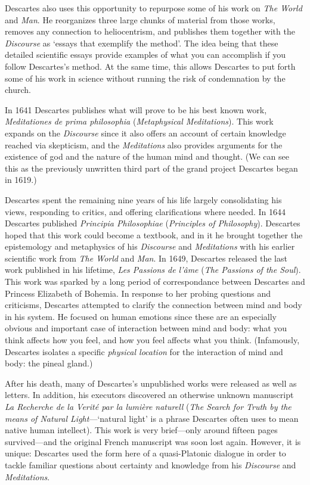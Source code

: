 Descartes also uses this opportunity to repurpose some of his work on \textit{The World} and \textit{Man}. He reorganizes three large chunks of material from those works, removes any connection to heliocentrism, and publishes them together with the \textit{Discourse} as `essays that exemplify the method'. The idea being that these detailed scientific essays provide examples of what you can accomplish if you follow Descartes's method. At the same time, this allows Descartes to put forth some of his work in science without running the risk of condemnation by the church.

In 1641 Descartes publishes what will prove to be his best known work, \textit{Meditationes de prima philosophia} (\textit{Metaphysical Meditations}). This work expands on the \textit{Discourse} since it also offers an account of certain knowledge reached via skepticism, and the \textit{Meditations} also provides arguments for the existence of god and the nature of the human mind and thought. (We can see this as the previously unwritten third part of the grand project Descartes began in 1619.)

Descartes spent the remaining nine years of his life largely consolidating his views, responding to critics, and offering clarifications where needed. In 1644 Descartes published \textit{Principia Philosophiae} (\textit{Principles of Philosophy}). Descartes hoped that this work could become a textbook, and in it he brought together the epistemology and metaphysics of his \textit{Discourse} and \textit{Meditations} with his earlier scientific work from \textit{The World} and \textit{Man}. In 1649, Descartes released the last work published in his lifetime, \textit{Les Passions de l'âme} (\textit{The Passions of the Soul}). This work was sparked by a long period of correspondance between Descartes and Princess Elizabeth of Bohemia. In response to her probing questions and criticisms, Descartes attempted to clarify the connection between mind and body in his system. He focused on human emotions since these are an especially obvious and important case of interaction between mind and body: what you think affects how you feel, and how you feel affects what you think. (Infamously, Descartes isolates a specific \textit{physical location} for the interaction of mind and body: the pineal gland.)

After his death, many of Descartes's unpublished works were released as well as letters. In addition, his executors discovered an otherwise unknown manuscript \textit{La Recherche de la Verité par la lumière naturell} (\textit{The Search for Truth by the means of Natural Light}---`natural light' is a phrase Descartes often uses to mean native human intellect). This work is very brief---only around fifteen pages survived---and the original French manuscript was soon lost again. However, it is unique: Descartes used the form here of a quasi-Platonic dialogue in order to tackle familiar questions about certainty and knowledge from his \textit{Discourse} and \textit{Meditations}.

